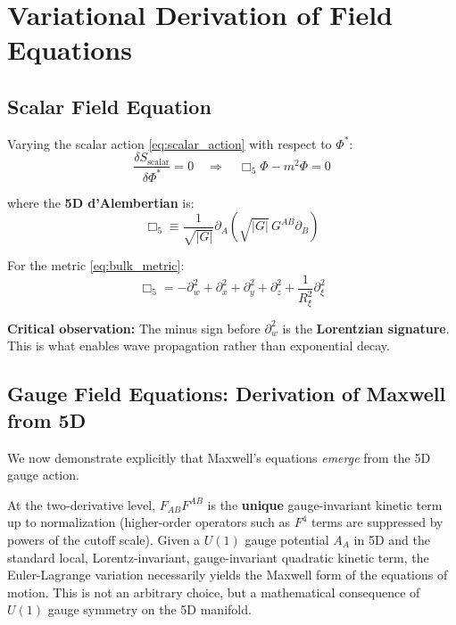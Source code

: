 \newpage

\section{Variational Derivation of Field Equations}
\label{sec:variations}

\subsection{Scalar Field Equation}

Varying the scalar action \eqref{eq:scalar_action} with respect to $\Phi^*$:
\begin{equation}
\frac{\delta S_{\text{scalar}}}{\delta \Phi^*} = 0 \quad \Rightarrow \quad \Box_5 \Phi - m^2 \Phi = 0
\label{eq:scalar_eom}
\end{equation}

where the \textbf{5D d'Alembertian} is:
\begin{equation}
\Box_5 \equiv \frac{1}{\sqrt{|G|}}\partial_A\left(\sqrt{|G|}\,G^{AB}\partial_B\right)
\label{eq:dalembertian_5d}
\end{equation}

For the metric \eqref{eq:bulk_metric}:
\begin{equation}
\boxed{\Box_5 = -\partial_w^2 + \partial_x^2 + \partial_y^2 + \partial_z^2 + \frac{1}{R_\xi^2}\partial_\xi^2}
\label{eq:box5_explicit}
\end{equation}

\textbf{Critical observation:} The minus sign before $\partial_w^2$ is the \textbf{Lorentzian signature}. This is what enables wave propagation rather than exponential decay.

\subsection{Gauge Field Equations: Derivation of Maxwell from 5D}
\label{subsec:maxwell_derivation}

We now demonstrate explicitly that Maxwell's equations \textit{emerge} from the 5D gauge action.

\begin{tcolorbox}[colback=blue!5,colframe=blue!50!black,title=\textbf{Methodological Note}]
At the two-derivative level, $F_{AB}F^{AB}$ is the \textbf{unique} gauge-invariant kinetic term up to normalization (higher-order operators such as $F^4$ terms are suppressed by powers of the cutoff scale). Given a $U(1)$ gauge potential $A_A$ in 5D and the standard local, Lorentz-invariant, gauge-invariant quadratic kinetic term, the Euler-Lagrange variation necessarily yields the Maxwell form of the equations of motion. This is not an arbitrary choice, but a mathematical consequence of $U(1)$ gauge symmetry on the 5D manifold.
\end{tcolorbox}

